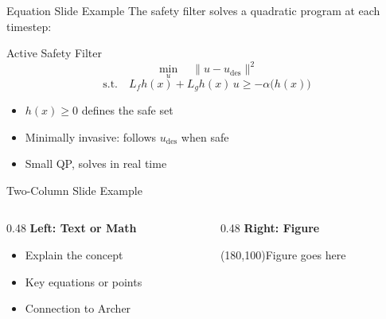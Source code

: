 \begin{frame}{Equation Slide Example}
  The safety filter solves a quadratic program at each timestep:

  \vskip10pt
  \begin{block}{Active Safety Filter}
    \vskip4pt
    \begin{equation*}
      \min_{u} \quad \| u - u_{\text{des}} \|^2
    \end{equation*}
    \vskip-4pt
    \begin{equation*}
      \text{s.t.} \quad L_f h(x) + L_g h(x)\, u \geq -\alpha\big(h(x)\big)
    \end{equation*}
    \vskip2pt
  \end{block}

  \vskip8pt
  \begin{itemize}
    \item $h(x) \geq 0$ defines the safe set
    \item Minimally invasive: follows $u_{\text{des}}$ when safe
    \item Small QP, solves in real time
  \end{itemize}
\end{frame}

\begin{frame}{Two-Column Slide Example}
  \begin{columns}[T]
    \begin{column}{0.48\textwidth}
      \textbf{Left: Text or Math}

      \vskip8pt
      \begin{itemize}
        \item Explain the concept
        \item Key equations or points
        \item Connection to Archer
      \end{itemize}
    \end{column}
    \begin{column}{0.48\textwidth}
      \textbf{Right: Figure}

      \vskip8pt
      \begin{center}
        {\color{slate400}\framebox(180,100){Figure goes here}}
      \end{center}
    \end{column}
  \end{columns}
\end{frame}


